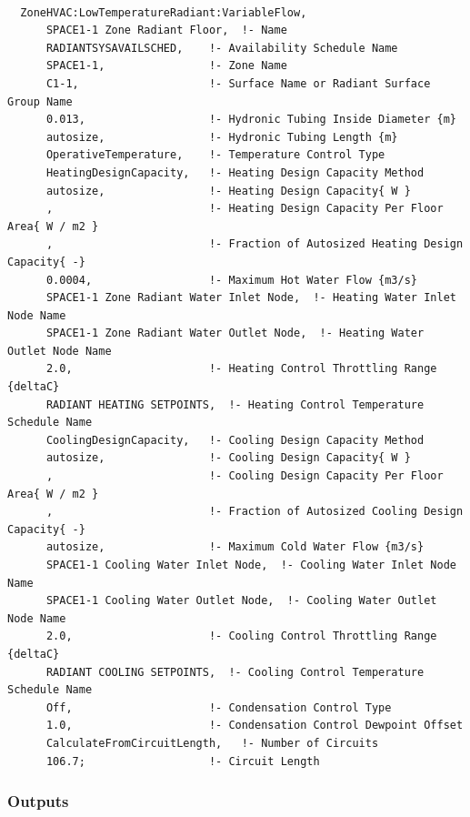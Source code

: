\begin{lstlisting}

  ZoneHVAC:LowTemperatureRadiant:VariableFlow,
      SPACE1-1 Zone Radiant Floor,  !- Name
      RADIANTSYSAVAILSCHED,    !- Availability Schedule Name
      SPACE1-1,                !- Zone Name
      C1-1,                    !- Surface Name or Radiant Surface Group Name
      0.013,                   !- Hydronic Tubing Inside Diameter {m}
      autosize,                !- Hydronic Tubing Length {m}
      OperativeTemperature,    !- Temperature Control Type
      HeatingDesignCapacity,   !- Heating Design Capacity Method
      autosize,                !- Heating Design Capacity{ W }
      ,                        !- Heating Design Capacity Per Floor Area{ W / m2 }
      ,                        !- Fraction of Autosized Heating Design Capacity{ -}
      0.0004,                  !- Maximum Hot Water Flow {m3/s}
      SPACE1-1 Zone Radiant Water Inlet Node,  !- Heating Water Inlet Node Name
      SPACE1-1 Zone Radiant Water Outlet Node,  !- Heating Water Outlet Node Name
      2.0,                     !- Heating Control Throttling Range {deltaC}
      RADIANT HEATING SETPOINTS,  !- Heating Control Temperature Schedule Name
      CoolingDesignCapacity,   !- Cooling Design Capacity Method
      autosize,                !- Cooling Design Capacity{ W }
      ,                        !- Cooling Design Capacity Per Floor Area{ W / m2 }
      ,                        !- Fraction of Autosized Cooling Design Capacity{ -}
      autosize,                !- Maximum Cold Water Flow {m3/s}
      SPACE1-1 Cooling Water Inlet Node,  !- Cooling Water Inlet Node Name
      SPACE1-1 Cooling Water Outlet Node,  !- Cooling Water Outlet Node Name
      2.0,                     !- Cooling Control Throttling Range {deltaC}
      RADIANT COOLING SETPOINTS,  !- Cooling Control Temperature Schedule Name
      Off,                     !- Condensation Control Type
      1.0,                     !- Condensation Control Dewpoint Offset
      CalculateFromCircuitLength,   !- Number of Circuits
      106.7;                   !- Circuit Length
\end{lstlisting}

\subsubsection{Outputs}\label{outputs-5-007}

